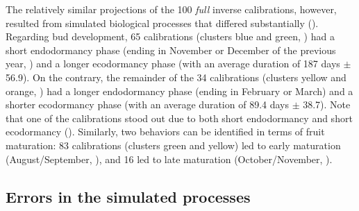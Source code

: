 \documentclass[letterpaper,8pt]{extarticle}  %
\begin{document}
\begin{doublespacing}
\begin{linenumbers}
The relatively similar projections of the 100 \emph{full} inverse calibrations, however, resulted from simulated biological processes that differed substantially (). Regarding bud development, 65 calibrations (clusters blue and green, )  had a short endodormancy phase (ending in November or December of the previous year, ) and a longer ecodormancy phase (with an average duration of 187 days $\pm$ 56.9). On the contrary, the remainder of the 34 calibrations (clusters yellow and orange, ) had a longer endodormancy phase (ending in February or March) and a shorter ecodormancy phase (with an average duration of 89.4 days $\pm$ 38.7). Note that one of the calibrations stood out due to both short endodormancy and short ecodormancy (). Similarly, two behaviors can be identified in terms of fruit maturation: 83 calibrations (clusters green and yellow) led to early maturation (August/September, ), and 16 led to late maturation (October/November, ).





\subsection{Errors in the simulated processes}


\end{linenumbers}
\end{doublespacing}
\end{document}
